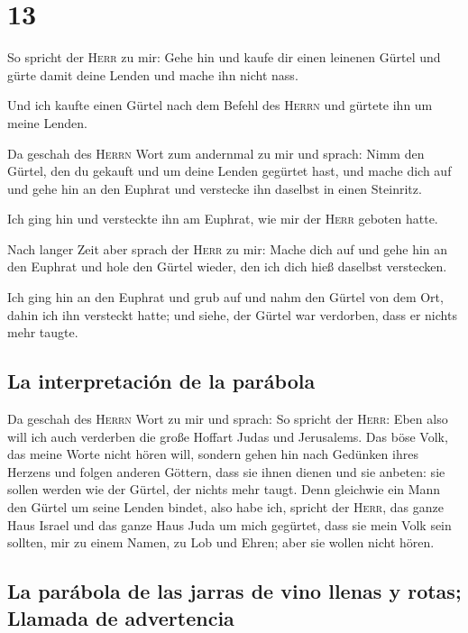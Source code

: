 \hypertarget{section-12}{%
\section{13}\label{section-12}}

 So spricht der \textsc{Herr} zu mir: Gehe hin und kaufe
dir einen leinenen Gürtel und gürte damit deine Lenden und mache ihn
nicht nass.

 Und ich kaufte einen Gürtel nach dem Befehl des
\textsc{Herrn} und gürtete ihn um meine Lenden.

 Da geschah des \textsc{Herrn} Wort zum andernmal zu mir
und sprach:  Nimm den Gürtel, den du gekauft und um deine
Lenden gegürtet hast, und mache dich auf und gehe hin an den Euphrat und
verstecke ihn daselbst in einen Steinritz.

 Ich ging hin und versteckte ihn am Euphrat, wie mir der
\textsc{Herr} geboten hatte.

 Nach langer Zeit aber sprach der \textsc{Herr} zu mir:
Mache dich auf und gehe hin an den Euphrat und hole den Gürtel wieder,
den ich dich hieß daselbst verstecken.

 Ich ging hin an den Euphrat und grub auf und nahm den
Gürtel von dem Ort, dahin ich ihn versteckt hatte; und siehe, der Gürtel
war verdorben, dass er nichts mehr taugte.

\hypertarget{la-interpretaciuxf3n-de-la-paruxe1bola}{%
\subsection{La interpretación de la
parábola}\label{la-interpretaciuxf3n-de-la-paruxe1bola}}

 Da geschah des \textsc{Herrn} Wort zu mir und sprach:
 So spricht der \textsc{Herr}: Eben also will ich auch
verderben die große Hoffart Judas und Jerusalems.  Das
böse Volk, das meine Worte nicht hören will, sondern gehen hin nach
Gedünken ihres Herzens und folgen anderen Göttern, dass sie ihnen dienen
und sie anbeten: sie sollen werden wie der Gürtel, der nichts mehr
taugt.  Denn gleichwie ein Mann den Gürtel um seine
Lenden bindet, also habe ich, spricht der \textsc{Herr}, das ganze Haus
Israel und das ganze Haus Juda um mich gegürtet, dass sie mein Volk sein
sollten, mir zu einem Namen, zu Lob und Ehren; aber sie wollen nicht
hören.

\hypertarget{la-paruxe1bola-de-las-jarras-de-vino-llenas-y-rotas-llamada-de-advertencia}{%
\subsection{La parábola de las jarras de vino llenas y rotas; Llamada de
advertencia}\label{la-paruxe1bola-de-las-jarras-de-vino-llenas-y-rotas-llamada-de-advertencia}}

